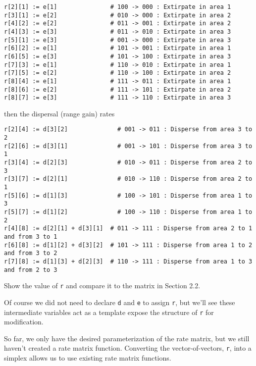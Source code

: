\begin{snugshade}
\begin{lstlisting}
r[2][1] := e[1]               # 100 -> 000 : Extirpate in area 1
r[3][1] := e[2]               # 010 -> 000 : Extirpate in area 2
r[4][2] := e[2]               # 011 -> 001 : Extirpate in area 2
r[4][3] := e[3]               # 011 -> 010 : Extirpate in area 3
r[5][1] := e[3]               # 001 -> 000 : Extirpate in area 3
r[6][2] := e[1]               # 101 -> 001 : Extirpate in area 1
r[6][5] := e[3]               # 101 -> 100 : Extirpate in area 3
r[7][3] := e[1]               # 110 -> 010 : Extirpate in area 1
r[7][5] := e[2]               # 110 -> 100 : Extirpate in area 2
r[8][4] := e[1]               # 111 -> 011 : Extirpate in area 1
r[8][6] := e[2]               # 111 -> 101 : Extirpate in area 2
r[8][7] := e[3]               # 111 -> 110 : Extirpate in area 3
\end{lstlisting}
\end{snugshade}

then the dispersal (range gain) rates

\begin{snugshade}
\begin{lstlisting}
r[2][4] := d[3][2]              # 001 -> 011 : Disperse from area 3 to 2
r[2][6] := d[3][1]              # 001 -> 101 : Disperse from area 3 to 1
r[3][4] := d[2][3]              # 010 -> 011 : Disperse from area 2 to 3
r[3][7] := d[2][1]              # 010 -> 110 : Disperse from area 2 to 1
r[5][6] := d[1][3]              # 100 -> 101 : Disperse from area 1 to 3
r[5][7] := d[1][2]              # 100 -> 110 : Disperse from area 1 to 2
r[4][8] := d[2][1] + d[3][1]  # 011 -> 111 : Disperse from area 2 to 1 and from 3 to 1
r[6][8] := d[1][2] + d[3][2]  # 101 -> 111 : Disperse from area 1 to 2 and from 3 to 2
r[7][8] := d[1][3] + d[2][3]  # 110 -> 111 : Disperse from area 1 to 3 and from 2 to 3
\end{lstlisting}
\end{snugshade}

Show the value of {\tt r} and compare it to the matrix in Section 2.2.

Of course we did not need to declare {\tt d} and {\tt e} to assign {\tt r}, but we'll see these intermediate variables act as a template expose the structure of {\tt r} for modification.

So far, we only have the desired parameterization of the rate matrix, but we still haven't created a rate matrix function. Converting the vector-of-vectors, {\tt r}, into a simplex allows us to use existing rate matrix functions. 

